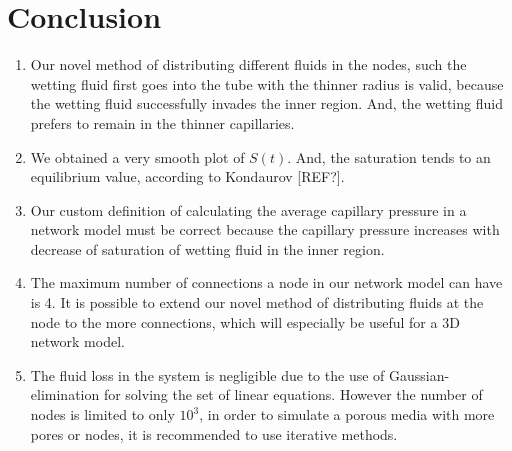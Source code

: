 \documentclass[
	12pt
] {article}
\begin{document}
	
\section{Conclusion}
	\begin{enumerate}
		\item Our novel method of distributing different fluids in the nodes, such the wetting fluid first goes into the tube with the thinner radius is valid, because the wetting fluid successfully invades the inner region. And, the wetting fluid prefers to remain in the thinner capillaries.
		
		\item We obtained a very smooth plot of $S(t)$. And, the saturation tends to an equilibrium value, according to Kondaurov [REF?].
		
		\item Our custom definition of calculating the average capillary pressure in a network model must be correct because the capillary pressure increases with decrease of saturation of wetting fluid in the inner region.
		
		\item The maximum number of connections a node in our network model can have is 4. It is possible to extend our novel method of distributing fluids at the node to the more connections, which will especially be useful for a 3D network model.
		
		\item The fluid loss in the system is negligible due to the use of Gaussian-elimination for solving the set of linear equations. However the number of nodes is limited to only $10^3$, in order to simulate a porous media with more pores or nodes, it is recommended to use iterative methods.
	\end{enumerate}



\end{document}
